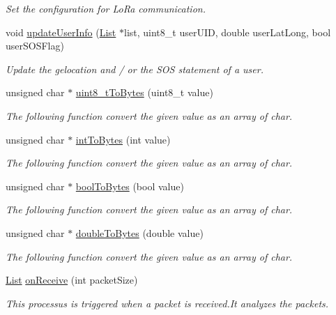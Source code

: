 \begin{DoxyCompactItemize}
\begin{DoxyCompactList}\small\item\em Set the configuration for Lo\+Ra communication. \end{DoxyCompactList}\item 
void \hyperlink{_lo_ra_ultra_team_8ino_ac6846fd27e53576e96948324e6156f94}{update\+User\+Info} (\hyperlink{struct_list}{List} $\ast$list, uint8\+\_\+t user\+U\+ID, double user\+Lat\+Long, bool user\+S\+O\+S\+Flag)
\begin{DoxyCompactList}\small\item\em Update the gelocation and / or the S\+OS statement of a user. \end{DoxyCompactList}\item 
unsigned char $\ast$ \hyperlink{_lo_ra_ultra_team_8ino_a96409a025a960ed10eec19c4dc06ab08}{uint8\+\_\+t\+To\+Bytes} (uint8\+\_\+t value)
\begin{DoxyCompactList}\small\item\em The following function convert the given value as an array of char. \end{DoxyCompactList}\item 
unsigned char $\ast$ \hyperlink{_lo_ra_ultra_team_8ino_a734e45b1d49738b2b3ec078aa39679e3}{int\+To\+Bytes} (int value)
\begin{DoxyCompactList}\small\item\em The following function convert the given value as an array of char. \end{DoxyCompactList}\item 
unsigned char $\ast$ \hyperlink{_lo_ra_ultra_team_8ino_a3b9e4dd95b30c76a562202b4e0d83e97}{bool\+To\+Bytes} (bool value)
\begin{DoxyCompactList}\small\item\em The following function convert the given value as an array of char. \end{DoxyCompactList}\item 
unsigned char $\ast$ \hyperlink{_lo_ra_ultra_team_8ino_a65b01978e8befa16b9417ed30f4f1ffb}{double\+To\+Bytes} (double value)
\begin{DoxyCompactList}\small\item\em The following function convert the given value as an array of char. \end{DoxyCompactList}\item 
\hyperlink{struct_list}{List} \hyperlink{_lo_ra_ultra_team_8ino_a466998c561ceb177a255f7d298ef220b}{on\+Receive} (int packet\+Size)
\begin{DoxyCompactList}\small\item\em This processus is triggered when a packet is received.\+It analyzes the packets. \end{DoxyCompactList}\end{DoxyCompactItemize}
